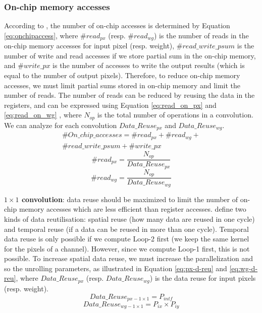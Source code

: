 \subsubsection{On-chip memory accesses}
%
According to \textcite{ma_optimizing_2018}, the number of on-chip accesses is determined by Equation \eqref{eq:onchipaccess}, where $\#read_{px}$ (resp. $\#read_{wg}$) is the number of reads in the on-chip memory accesses for input pixel (resp. weight), $\#read\_write\_psum$ is the number of write and read accesses if we store partial sum in the on-chip memory, and  $\#write\_px$ is the number of accesses to write the output results (which is equal to the number of output pixels). Therefore, to reduce on-chip memory accesses, we must limit partial sums stored in on-chip memory and limit the number of reads.
The number of reads can be reduced by reusing the data in the registers, and can be expressed using Equation \ref{eq:read_on_px} and \ref{eq:read_on_wg} \cite{ma_optimizing_2018}, where $N_{op}$ is the total number of operations in a convolution. We can analyze for each convolution $Data\_Reuse_{px}$ and $Data\_Reuse_{wg}$.
%
\begin{multline}
    \#On\_chip\_accesses = \#read_{px} + \#read_{wg} + \\ \#read\_write\_psum + \#write\_px
    \label{eq:onchipaccess}
\end{multline}
%
\begin{equation}
    \#read_{px} = \frac{N_{op}}{Data\_Reuse_{px}}
    \label{eq:read_on_px}
\end{equation}
%
\begin{equation}
    \#read_{wg} = \frac{N_{op}}{Data\_Reuse_{wg}}
    \label{eq:read_on_wg}
\end{equation}

\textbf{$1 \times 1$ convolution}: data reuse should be maximized to limit the number of on-chip memory accesses which are less efficient than register accesses. \textcite{ma_optimizing_2018} define two kinds of data reutilisation: spatial reuse (how many data are reused in one cycle) and temporal reuse (if a data can be reused in more than one cycle). Temporal data reuse is only possible if we compute Loop-2 first (we keep the same kernel for the pixels of a channel). However, since we compute Loop-1 first, this is not possible. To increase spatial data reuse, we must increase the parallelization and so the unrolling parameters, as illustrated in Equation \eqref{eq:px-d-reu} and \eqref{eq:wg-d-reu}, where $Data\_Reuse_{px}$ (resp. $Data\_Reuse_{wg}$) is the data reuse for input pixels (resp. weight).
%
\begin{equation}
    Data\_Reuse_{px - 1 \times 1} = P_{intf}
    \label{eq:px-d-reu}
\end{equation}
\begin{equation}
    Data\_Reuse_{wg - 1 \times 1} = P_{ix} \times P_{iy}
    \label{eq:wg-d-reu}
\end{equation}

